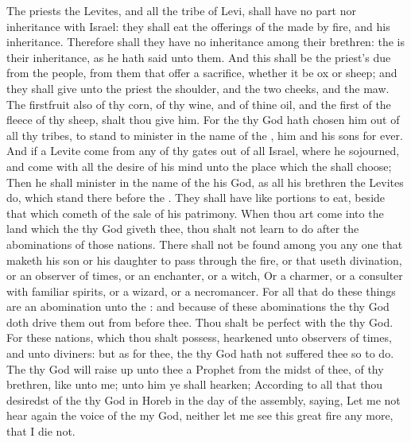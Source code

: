 \begin{biblechapter} %
 The priests the Levites, and all the tribe of Levi, shall have no part nor inheritance with Israel: they shall eat the offerings of the \LORD made by fire, and his inheritance.
\verse Therefore shall they have no inheritance among their brethren: the \LORD is their inheritance, as he hath said unto them.
\verse And this shall be the priest's due from the people, from them that offer a sacrifice, whether it be ox or sheep; and they shall give unto the priest the shoulder, and the two cheeks, and the maw.
\verse The firstfruit also of thy corn, of thy wine, and of thine oil, and the first of the fleece of thy sheep, shalt thou give him.
\verse For the \LORD thy God hath chosen him out of all thy tribes, to stand to minister in the name of the \LORD, him and his sons for ever.
\verse And if a Levite come from any of thy gates out of all Israel, where he sojourned, and come with all the desire of his mind unto the place which the \LORD shall choose;
\verse Then he shall minister in the name of the \LORD his God, as all his brethren the Levites do, which stand there before the \LORD.
\verse They shall have like portions to eat, beside that which cometh of the sale of his patrimony.
 When thou art come into the land which the \LORD thy God giveth thee, thou shalt not learn to do after the abominations of those nations.
\verse There shall not be found among you any one that maketh his son or his daughter to pass through the fire, or that useth divination, or an observer of times, or an enchanter, or a witch,
\verse Or a charmer, or a consulter with familiar spirits, or a wizard, or a necromancer.
\verse For all that do these things are an abomination unto the \LORD: and because of these abominations the \LORD thy God doth drive them out from before thee.
\verse Thou shalt be perfect with the \LORD thy God.
 For these nations, which thou shalt possess, hearkened unto observers of times, and unto diviners: but as for thee, the \LORD thy God hath not suffered thee so to do.
\verse The \LORD thy God will raise up unto thee a Prophet from the midst of thee, of thy brethren, like unto me; unto him ye shall hearken;
\verse According to all that thou desiredst of the \LORD thy God in Horeb in the day of the assembly, saying, Let me not hear again the voice of the \LORD my God, neither let me see this great fire any more, that I die not.

\end{biblechapter}
